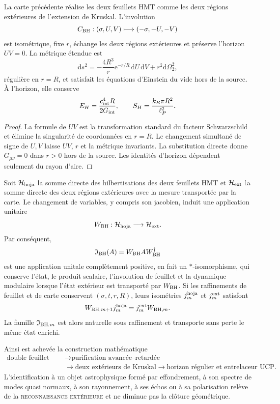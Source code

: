 \begin{theorem}
\label{thm:hmtf2-bh-doble-hoja}
La carte précédente réalise les deux feuillets HMT comme les deux régions extérieures
de l'extension de Kruskal. L'involution
\[
 C_{\rm BH}:(\sigma,U,V)\longmapsto(-\sigma,-U,-V)
\]
est isométrique, fixe \(r\), échange les deux régions extérieures et
préserve l'horizon \(UV=0\). La métrique étendue est
\[
 \mathrm ds^2
 =-\frac{4R^3}{r}\mathrm e^{-r/R}\,\mathrm dU\,\mathrm dV
 +r^2\mathrm d\Omega_2^2,
\]
régulière en \(r=R\), et satisfait les équations d'Einstein du vide hors
de la source. À l'horizon, elle conserve
\[
 E_H=\frac{c_{\rm int}^4R}{2G_{\rm int}},\qquad
 S_H=\frac{k_B\pi R^2}{\ell_P^2}.
\]
\end{theorem}

\begin{proof}
La formule de \(UV\) est la transformation standard du facteur
Schwarzschild et élimine la singularité de coordonnées en \(r=R\).
Le changement simultané de signe de \(U,V\) laisse \(UV\), \(r\) et la métrique
invariants. La substitution directe donne \(G_{\mu\nu}=0\) dans \(r>0\) hors de
la source. Les identités d'horizon dépendent seulement du rayon d'aire.
\end{proof}

Soit \(\mathcal H_{\rm hoja}\) la somme directe des hilbertisations des
deux feuillets HMT et \(\mathcal H_{\rm ext}\) la somme directe des deux régions
extérieures avec la mesure transportée par la carte. Le changement de variables,
y compris son jacobien, induit une application unitaire
\[
 W_{\rm BH}:\mathcal H_{\rm hoja}\longrightarrow\mathcal H_{\rm ext}.
\]
Par conséquent,
\[
 \mathfrak I_{\rm BH}(A)=W_{\rm BH}AW_{\rm BH}^{\dagger}
\]
est une application unitale complètement positive, en fait un
\(*\)-isomorphisme, qui conserve l'état, le produit scalaire, l'involution de feuillet
et la dynamique modulaire lorsque l'état extérieur est transporté par \(W_{\rm BH}\).
Si les raffinements de feuillet et de carte conservent
\((\sigma,t,r,R)\), leurs isométries \(j_m^{\rm hoja}\) et
\(j_m^{\rm ext}\) satisfont
\[
 W_{{\rm BH},m+1}j_m^{\rm hoja}
 =j_m^{\rm ext}W_{{\rm BH},m}.
\]
La famille \(\mathfrak I_{{\rm BH},m}\) est alors naturelle sous
raffinement et transporte sans perte le même état enrichi.

Ainsi est achevée la construction mathématique
\[
\begin{aligned}
 \text{double feuillet HMT}
 &\longrightarrow
 \text{purification avancée--retardée}\\
 &\longrightarrow
 \text{deux extérieurs de Kruskal}
 \longrightarrow
 \text{horizon régulier et entrelaceur UCP}.
\end{aligned}
\]
L'identification à un objet astrophysique formé par effondrement, à son spectre
de modes quasi normaux, à son rayonnement, à ses échos ou à sa polarisation relève de la
\textsc{reconnaissance extérieure} et ne diminue pas la clôture géométrique.
